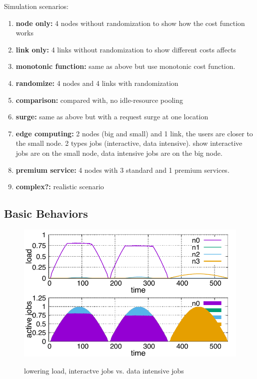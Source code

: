 Simulation scenarios:
\begin{enumerate}
  \item	{\bf node only:} 4 nodes without randomization to show how the
        cost function works
  \item	{\bf link only:} 4 links without randomization to show
        different costs affects
  \item	{\bf monotonic function:} same as above but use monotonic cost
        function.
  \item	{\bf randomize:} 4 nodes and 4 links with randomization
  \item {\bf comparison:} compared with, no idle-resource pooling
  \item	{\bf surge:} same as above but with a request surge at one location
  \item	{\bf edge computing:} 2 nodes (big and small) and 1 link, the
    users are closer to the small node. 2 types jobs (interactive,
    data intensive).  show interactive jobs are on the small node,
    data intensive jobs are on the big node.
  \item {\bf premium service:} 4 nodes with 3 standard and 1 premium services.
  \item	{\bf complex?:} realistic scenario
\end{enumerate}

\subsection{Basic Behaviors}

\begin{figure}[tb]
  \begin{center}
    \includegraphics[width=1.0\columnwidth]{lowering.pdf}
    \vspace{-2.0ex}
    \caption{lowering load, interactve jobs vs. data intensive jobs}
    \label{fig:lowering}
  \end{center}
\end{figure}

